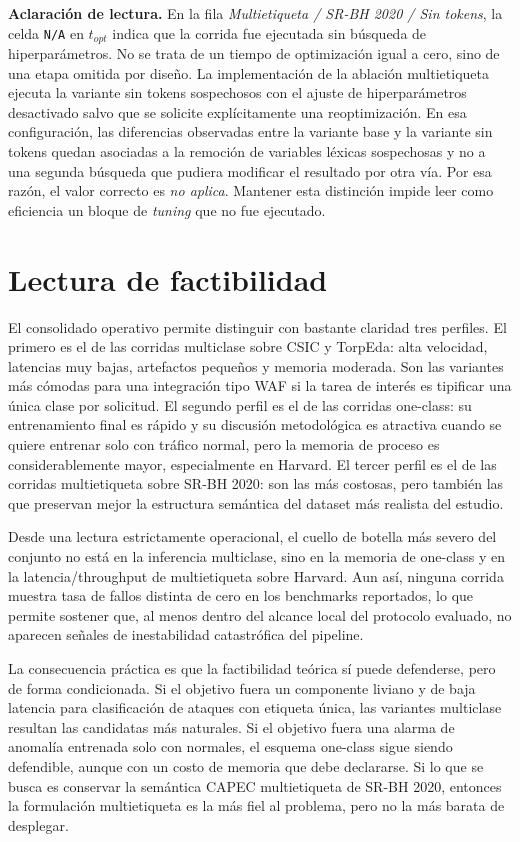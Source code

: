 \documentclass[12pt,oneside]{report}
\begin{document}
\noindent\textbf{Aclaración de lectura.} En la fila \textit{Multietiqueta / SR-BH 2020 / Sin tokens}, la celda \texttt{N/A} en $t_{opt}$ indica que la corrida fue ejecutada sin búsqueda de hiperparámetros. No se trata de un tiempo de optimización igual a cero, sino de una etapa omitida por diseño. La implementación de la ablación multietiqueta ejecuta la variante sin tokens sospechosos con el ajuste de hiperparámetros desactivado salvo que se solicite explícitamente una reoptimización. En esa configuración, las diferencias observadas entre la variante base y la variante sin tokens quedan asociadas a la remoción de variables léxicas sospechosas y no a una segunda búsqueda que pudiera modificar el resultado por otra vía. Por esa razón, el valor correcto es \textit{no aplica}. Mantener esta distinción impide leer como eficiencia un bloque de \textit{tuning} que no fue ejecutado.

\section{Lectura de factibilidad}
El consolidado operativo permite distinguir con bastante claridad tres perfiles. El primero es el de las corridas multiclase sobre CSIC y TorpEda: alta velocidad, latencias muy bajas, artefactos pequeños y memoria moderada. Son las variantes más cómodas para una integración tipo WAF si la tarea de interés es tipificar una única clase por solicitud. El segundo perfil es el de las corridas one-class: su entrenamiento final es rápido y su discusión metodológica es atractiva cuando se quiere entrenar solo con tráfico normal, pero la memoria de proceso es considerablemente mayor, especialmente en Harvard. El tercer perfil es el de las corridas multietiqueta sobre SR-BH 2020: son las más costosas, pero también las que preservan mejor la estructura semántica del dataset más realista del estudio.\

Desde una lectura estrictamente operacional, el cuello de botella más severo del conjunto no está en la inferencia multiclase, sino en la memoria de one-class y en la latencia/throughput de multietiqueta sobre Harvard. Aun así, ninguna corrida muestra tasa de fallos distinta de cero en los benchmarks reportados, lo que permite sostener que, al menos dentro del alcance local del protocolo evaluado, no aparecen señales de inestabilidad catastrófica del pipeline.\

La consecuencia práctica es que la factibilidad teórica sí puede defenderse, pero de forma condicionada. Si el objetivo fuera un componente liviano y de baja latencia para clasificación de ataques con etiqueta única, las variantes multiclase resultan las candidatas más naturales. Si el objetivo fuera una alarma de anomalía entrenada solo con normales, el esquema one-class sigue siendo defendible, aunque con un costo de memoria que debe declararse. Si lo que se busca es conservar la semántica CAPEC multietiqueta de SR-BH 2020, entonces la formulación multietiqueta es la más fiel al problema, pero no la más barata de desplegar.\
\end{document}
